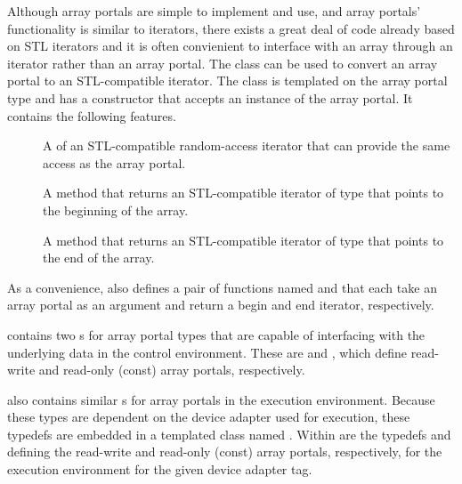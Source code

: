 Although array portals are simple to implement and use, and array portals'
functionality is similar to iterators, there exists a great deal of code
already based on STL iterators and it is often convienient to interface
with an array through an iterator rather than an array portal. The
 class can be used to convert an array
portal to an STL-compatible iterator. The class is templated on the array
portal type and has a constructor that accepts an instance of the array
portal. It contains the following features.
\begin{description}
\item[] A  of an STL-compatible
  random-access iterator that can provide the same access as the array
  portal.
\item[] A method that returns an STL-compatible iterator
  of type  that points to the beginning of the
  array.
\item[] A method that returns an STL-compatible iterator
  of type  that points to the end of the array.
\end{description}


As a convenience,  also
defines a pair of functions named 
 and 
 that each take an array portal as an
argument and return a begin and end iterator, respectively.


 contains two s for array
portal types that are capable of interfacing with the underlying data in
the control environment. These are 
 and ,
 which define read-write and read-only (const)
array portals, respectively.

 also contains similar s for
array portals in the execution environment. Because these types are
dependent on the device adapter used for execution, these typedefs are
embedded in a templated class named .
 Within  are the typedefs
 and  defining the read-write and
read-only (const) array portals, respectively, for the execution
environment for the given device adapter tag.


